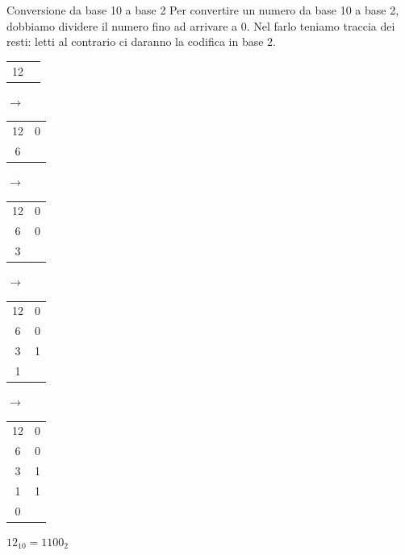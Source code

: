 \documentclass[handout]{beamer}
\begin{document}
\begin{frame}{Conversione da base 10 a base 2}
Per convertire un numero da base 10 a base 2, dobbiamo dividere il numero fino ad arrivare a 0. Nel farlo teniamo traccia dei resti: letti al contrario ci daranno la codifica in base 2.

\begin{tabular}{c|c}
		12 & \\
\end{tabular}
$\rightarrow$
\begin{tabular}{c|c}
	12 & 0\\
	6 & \\
\end{tabular}
$\rightarrow$
\begin{tabular}{c|c}
	12 & 0\\
	6 & 0\\
	3 & \\
\end{tabular}
$\rightarrow$
\begin{tabular}{c|c}
	12 & 0\\
	6 & 0\\
	3 & 1\\
	1 & \\
\end{tabular}
$\rightarrow$
\begin{tabular}{c|c}
	12 & 0\\
	6 & 0\\
	3 & 1\\
	1 & 1\\
	0 &
\end{tabular}

$12_{10} = 1100_2$
\end{frame}
\end{document}
